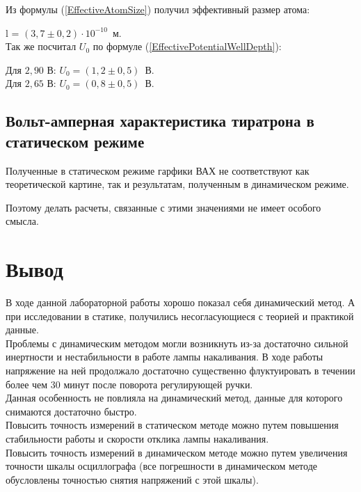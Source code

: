 Из формулы (\ref{EffectiveAtomSize}) получил эффективный размер атома:

l = $ \left( 3,7 \pm 0,2 \right) \cdot 10^{-10} \, $ м. \\

Так же посчитал $ U_0 $ по формуле (\ref{EffectivePotentialWellDepth}):

Для $ 2,90 $ В: $ U_0 = \left( 1,2 \pm 0,5 \right) \, $ В. \\
Для $ 2,65 $ В: $ U_0 = \left( 0,8 \pm 0,5 \right) \, $ В.

\subsection{Вольт-амперная характеристика тиратрона в статическом режиме}

Полученные в статическом режиме гарфики ВАХ не соответствуют как теоретической картине, так и
результатам, полученным в динамическом режиме.

Поэтому делать расчеты, связанные с этими значениями не имеет особого смысла.

\section{Вывод}

В ходе данной лабораторной работы хорошо показал себя динамический метод. А при
исследовании в статике, получились несогласующиеся с теорией и практикой данные. \\

Проблемы с динамическим методом могли возникнуть из-за достаточно сильной инертности и
нестабильности в работе лампы накаливания. В ходе работы напряжение на ней продолжало
достаточно существенно флуктуировать в течении более чем 30 минут после поворота
регулирующей ручки. \\

Данная особенность не повлияла на динамический метод, данные для которого снимаются
достаточно быстро. \\

Повысить точность измерений в статическом методе можно путем повышения стабильности работы
и скорости отклика лампы накаливания. \\

Повысить точность измерений в динамическом методе можно путем увеличения точности
шкалы осциллографа (все погрешности в динамическом методе обусловлены точностью снятия
напряжений с этой шкалы).
